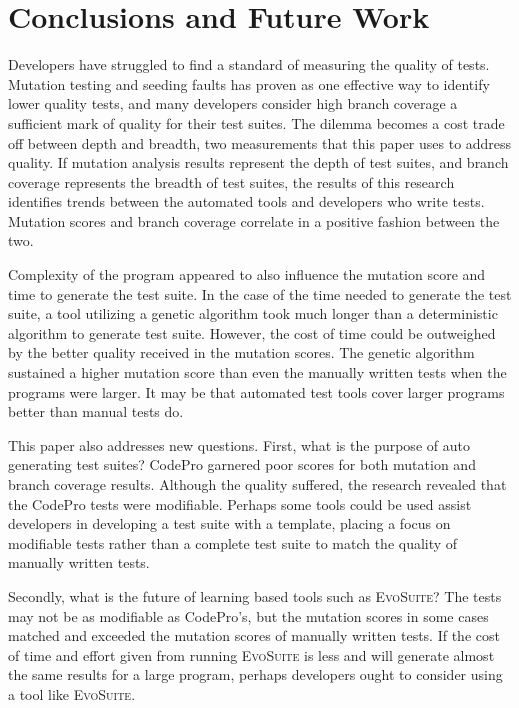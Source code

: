 \section{Conclusions and Future Work}
\label{sec:conclusion}
Developers have struggled to find a standard of measuring the quality of tests. Mutation testing and seeding faults has proven as one effective way to identify lower quality tests, and many developers consider high branch coverage a sufficient mark of quality for their test suites. The dilemma becomes a cost trade off between depth and breadth, two measurements that this paper uses to address quality. If mutation analysis results represent the depth of test suites, and branch coverage represents the breadth of test suites, the results of this research identifies trends between the automated tools and developers who write tests. Mutation scores and branch coverage correlate in a positive fashion between the two.

Complexity of the program appeared to also influence the mutation score and time to generate the test suite. In the case of the time needed to generate the test suite, a tool utilizing a genetic algorithm took much longer than a deterministic algorithm to generate test suite. However, the cost of time could be outweighed by the better quality received in the mutation scores. The genetic algorithm sustained a higher mutation score than even the manually written tests when the programs were larger. It may be that automated test tools cover larger programs better than manual tests do.

This paper also addresses new questions. First, what is the purpose of auto generating test suites? CodePro garnered poor scores for both mutation and branch coverage results. Although the quality suffered, the research revealed that the CodePro tests were modifiable. Perhaps some tools could be used assist developers in developing a test suite with a template, placing a focus on modifiable tests rather than a complete test suite to match the quality of manually written tests.

Secondly, what is the future of learning based tools such as  \textsc{EvoSuite}? The tests may not be as modifiable as CodePro's, but the mutation scores in some cases matched and exceeded the mutation scores of manually written tests. If the cost of time and effort given from running  \textsc{EvoSuite} is less and will generate almost the same results for a large program, perhaps developers ought to consider using a tool like  \textsc{EvoSuite}.

